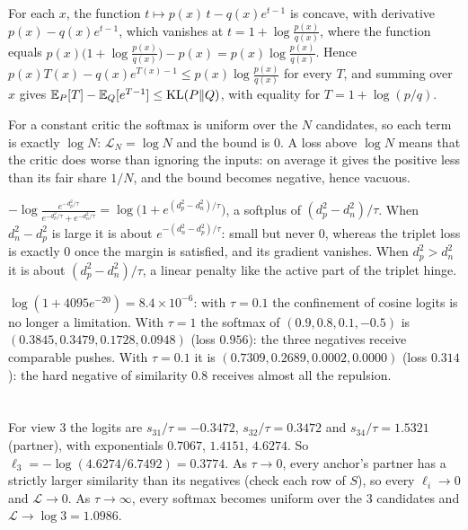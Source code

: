 For each $x$, the function $t\mapsto p(x)\,t - q(x)e^{t-1}$ is concave, with derivative $p(x) - q(x)e^{t-1}$, which vanishes at $t = 1 + \log\frac{p(x)}{q(x)}$,
where the function equals $p(x)\bigl(1 + \log\frac{p(x)}{q(x)}\bigr) - p(x) = p(x)\log\frac{p(x)}{q(x)}$. Hence $p(x)T(x) - q(x)e^{T(x)-1}\leq p(x)\log\frac{p(x)}{q(x)}$ for every $T$, and
summing over $x$ gives $\mathbb{E}_P[T] - \mathbb{E}_Q[e^{T-1}]\leq\mathrm{KL}(P\Vert Q)$, with equality for $T = 1 + \log(p/q)$.

For a constant critic the softmax is uniform over the $N$ candidates, so each term is exactly $\log N$: $\mathcal L_N = \log N$ and the
bound is $0$. A loss above $\log N$ means that the critic does worse than ignoring the inputs: on average it
gives the positive less than its fair share $1/N$, and the bound becomes negative, hence vacuous.

$-\log\frac{e^{-d_p^2/\tau}}{e^{-d_p^2/\tau} + e^{-d_n^2/\tau}} = \log\bigl(1 + e^{(d_p^2 - d_n^2)/\tau}\bigr)$, a softplus of $(d_p^2 - d_n^2)/\tau$. When $d_n^2 - d_p^2$ is large it is about $e^{-(d_n^2 - d_p^2)/\tau}$:
small but never $0$, whereas the triplet loss is exactly $0$ once the margin is satisfied, and its gradient
vanishes. When $d_p^2 > d_n^2$ it is about $(d_p^2 - d_n^2)/\tau$, a linear penalty like the active part of the triplet hinge.

$\log(1 + 4095e^{-20}) = 8.4\times10^{-6}$: with $\tau = 0.1$ the confinement of cosine logits is no longer a limitation. With $\tau = 1$
the softmax of $(0.9, 0.8, 0.1, -0.5)$ is $(0.3845, 0.3479, 0.1728, 0.0948)$ (loss $0.956$): the three negatives receive comparable pushes. With
$\tau = 0.1$ it is $(0.7309, 0.2689, 0.0002, 0.0000)$ (loss $0.314$): the hard negative of similarity $0.8$ receives almost all the
repulsion.

\section{}

For view $3$ the logits are $s_{31}/\tau = -0.3472$, $s_{32}/\tau = 0.3472$ and $s_{34}/\tau = 1.5321$ (partner), with exponentials $0.7067$, $1.4151$, $4.6274$.
So $\ell_3 = -\log(4.6274/6.7492) = 0.3774$. As $\tau\to0$, every anchor's partner has a strictly larger similarity than its
negatives (check each row of $S$), so every $\ell_i\to0$ and $\mathcal L\to0$. As $\tau\to\infty$, every softmax becomes uniform over the
$3$ candidates and $\mathcal L\to\log3 = 1.0986$.

